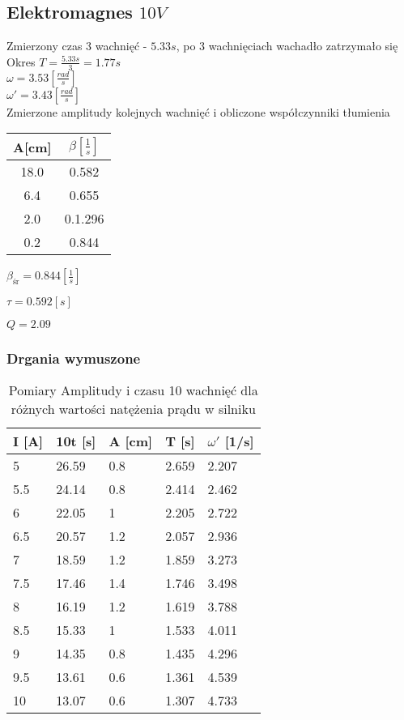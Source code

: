 \documentclass[]{article}
\begin{document}
	\subsection{Elektromagnes $10V$}
	Zmierzony czas 3 wachnięć - $5.33s$, po 3 wachnięciach wachadło zatrzymało się\\
	Okres $T=\frac{5.33s}{3} = 1.77s$\\
	$\omega = 3.53 \left[ \frac{rad}{s}\right]$\\
	$\omega' = 3.43 \left[ \frac{rad}{s}\right]$\\
	Zmierzone amplitudy kolejnych wachnięć i obliczone współczynniki tłumienia
	\begin{table}[h]
		\begin{tabular}{|c|c|}
			\hline 
			A[cm] & $\beta\left[ \frac{1}{s}\right] $ \\ 
			\hline 
			18.0 & 0.582 \\ 
			\hline 
			6.4 & 0.655 \\ 
			\hline 
			2.0 & 0.1.296 \\ 
			\hline 
			0.2 & 0.844 \\ 
			\hline 
		\end{tabular} 
	\end{table}
	
	$\beta_{\text{śr}} = 0.844 \left[ \frac{1}{s}\right] $
	
	$\tau=0.592[s]$
	
	$Q = 2.09$
	
	\subsubsection{Drgania wymuszone}
	
	\begin{table}[h]
		\centering
		\caption{Pomiary Amplitudy i czasu 10 wachnięć dla różnych wartości natężenia prądu w silniku}
		\begin{tabular}{|l|l|l|l|l|}
			\hline
			
			I [A] & 10t [s] & A [cm] & T [s] & $\omega'$ [1/s] \\ \hline
			5 & 26.59 & 0.8 & 2.659 & 2.207 \\ \hline
			5.5 & 24.14 & 0.8 & 2.414 & 2.462 \\ \hline
			6 & 22.05 & 1 & 2.205 & 2.722 \\ \hline
			6.5 & 20.57 & 1.2 & 2.057 & 2.936 \\ \hline
			7 & 18.59 & 1.2 & 1.859 & 3.273 \\ \hline
			7.5 & 17.46 & 1.4 & 1.746 & 3.498 \\ \hline
			8 & 16.19 & 1.2 & 1.619 & 3.788 \\ \hline
			8.5 & 15.33 & 1 & 1.533 & 4.011 \\ \hline
			9 & 14.35 & 0.8 & 1.435 & 4.296 \\ \hline
			9.5 & 13.61 & 0.6 & 1.361 & 4.539 \\ \hline
			10 & 13.07 & 0.6 & 1.307 & 4.733 \\ \hline
			
			
		\end{tabular}
	\end{table}
	
\end{document}
